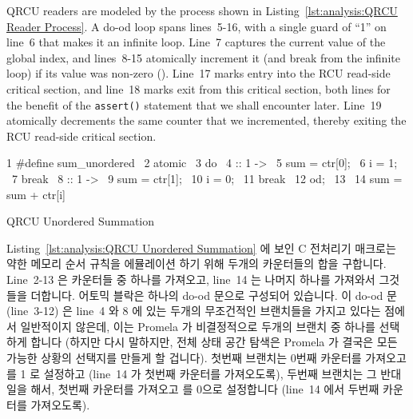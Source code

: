QRCU readers are modeled by the  process shown in
Listing~\ref{lst:analysis:QRCU Reader Process}.
A do-od loop spans lines~5-16, with a single guard of ``1''
on line~6 that makes it an infinite loop.
Line~7 captures the current value of the global index, and lines~8-15
atomically increment it (and break from the infinite loop)
if its value was non-zero ().
Line~17 marks entry into the RCU read-side critical section, and
line~18 marks exit from this critical section, both lines for the benefit of
the {\tt assert()} statement that we shall encounter later.
Line~19 atomically decrements the same counter that we incremented,
thereby exiting the RCU read-side critical section.
\fi

\begin{listing}[htbp]
{ \scriptsize
\begin{verbbox}
  1 #define sum_unordered \
  2   atomic { \
  3     do \
  4     :: 1 -> \
  5       sum = ctr[0]; \
  6       i = 1; \
  7       break \
  8     :: 1 -> \
  9       sum = ctr[1]; \
 10       i = 0; \
 11       break \
 12     od; \
 13   } \
 14   sum = sum + ctr[i]
\end{verbbox}
}
\centering
\theverbbox
\caption{QRCU Unordered Summation}
\label{lst:analysis:QRCU Unordered Summation}
\end{listing}

Listing~\ref{lst:analysis:QRCU Unordered Summation}
에 보인 C 전처리기 매크로는 약한 메모리 순서 규칙을 에뮬레이션 하기 위해 두개의
카운터들의 합을 구합니다.
Line~2-13 은 카운터들 중 하나를 가져오고, line~14 는 나머지 하나를 가져와서
그것들을 더합니다.
어토믹 블락은 하나의 do-od 문으로 구성되어 있습니다.
이 do-od 문 (line~3-12) 은 line~4 와 8 에 있는 두개의 무조건적인 브랜치들을
가지고 있다는 점에서 일반적이지 않은데, 이는 Promela 가 비결정적으로 두개의
브랜치 중 하나를 선택하게 합니다 (하지만 다시 말하지만, 전체 상태 공간 탐색은
Promela 가 결국은 모든 가능한 상황의 선택지를 만들게 할 겁니다).
첫번째 브랜치는 0번째 카운터를 가져오고  를 1 로 설정하고 (line~14 가
첫번째 카운터를 가져오도록), 두번째 브랜치는 그 반대 일을 해서, 첫번째 카운터를
가져오고 \co{i} 를 0으로 설정합니다 (line~14 에서 두번째 카운터를 가져오도록).
\iffalse

The C-preprocessor macro shown in
Listing~\ref{lst:analysis:QRCU Unordered Summation}
sums the pair of counters so as to emulate weak memory ordering.
Lines~2-13 fetch one of the counters, and line~14 fetches the other
of the pair and sums them.
The atomic block consists of a single do-od statement.
This do-od statement (spanning lines~3-12) is unusual in that
it contains two unconditional
branches with guards on lines~4 and~8, which causes Promela to
non-deterministically choose one of the two (but again, the full
state-space search causes Promela to eventually make all possible
choices in each applicable situation).
The first branch fetches the zero-th counter and sets \co{i} to 1 (so
that line~14 will fetch the first counter), while the second
branch does the opposite, fetching the first counter and setting \co{i}
to 0 (so that line~14 will fetch the second counter).
\fi

